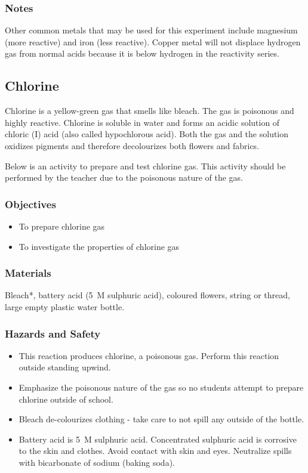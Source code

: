\subsubsection*{Notes}
Other common metals that may be used for this experiment include magnesium (more reactive) and iron (less reactive). Copper metal will not displace hydrogen gas from normal acids because it is below hydrogen in the reactivity series.

\subsection{Chlorine}

Chlorine is a yellow-green gas that smells like bleach. The gas is poisonous and highly reactive. Chlorine is soluble in water and forms an acidic solution of chloric (I) acid (also called hypochlorous acid). Both the gas and the solution oxidizes pigments and therefore decolourizes both flowers and fabrics.

Below is an activity to prepare and test chlorine gas. This activity should be performed by the teacher due to the poisonous nature of the gas.

\subsubsection*{Objectives}
\begin{itemize}
\item{To prepare chlorine gas}
\item{To investigate the properties of chlorine gas}
\end{itemize}

\subsubsection*{Materials}
Bleach*, battery acid (5~M sulphuric acid), coloured flowers, string or thread, large empty plastic water bottle.

\subsubsection*{Hazards and Safety}
\begin{itemize}
\item{This reaction produces chlorine, a poisonous gas. Perform this reaction outside standing upwind.}
\item{Emphasize the poisonous nature of the gas so no students attempt to prepare chlorine outside of school.}
\item{Bleach de-colourizes clothing - take care to not spill any outside of the bottle.}
\item{Battery acid is 5~M sulphuric acid. Concentrated sulphuric acid is corrosive to the skin and clothes. Avoid contact with skin and eyes. Neutralize spills with bicarbonate of sodium (baking soda).}
\end{itemize}

